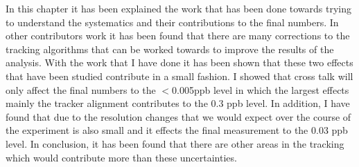 \documentclass[./Thesis]{subfiles}
\begin{document}
	In this chapter it has been explained the work that has been done towards trying to understand the systematics and their contributions to the final numbers.  In other contributors work it has been found that there are many corrections to the tracking algorithms that can be worked towards to improve the results of the analysis.  With the work that I have done it has been shown that these two effects that have been studied contribute in a small fashion.  I showed that cross talk will only affect the final numbers to the $<$0.005ppb level in which the largest effects mainly the tracker alignment contributes to the 0.3 ppb level.  In addition, I have found that due to the resolution changes that we would expect over the course of the experiment is also small and it effects the final measurement to the 0.03 ppb level. In conclusion, it has been found that there are other areas in the tracking which would contribute more than these uncertainties.
\end{document}
